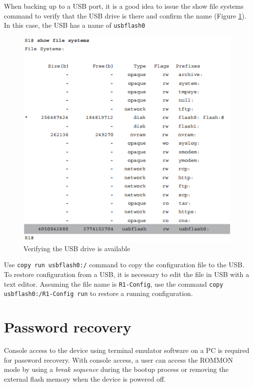 When backing up to a USB port, it is a good idea to issue the show file systems command to verify that the USB drive is there and confirm the name (Figure \ref{USB}). In this case, the USB has a name of \verb|usbflash0|

\begin{figure}[hbtp]
\caption{Verifying the USB drive is available}\label{USB}
\centering
\includegraphics[scale=0.8]{pictures/USB.PNG}
\end{figure}

Use \verb|copy run usbflash0:/| command to copy the configuration file to the USB. To restore configuration from a USB, it is necessary to edit the file in USB with a text editor. Assuming the file name is \verb|R1-Config|, use the command \verb|copy usbflash0:/R1-Config run| to restore a running configuration.

\section{Password recovery}

Console access to the device using terminal emulator software on a PC is required for password recovery. With console access, a user can access the ROMMON mode by using a \emph{break sequence} during the bootup process or removing the external flash memory when the device is powered off.\\

